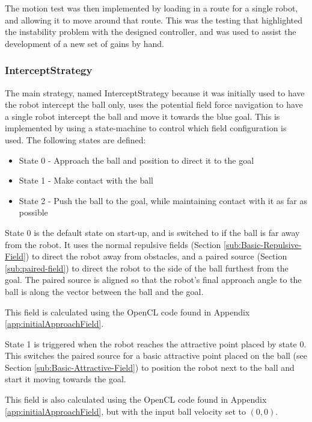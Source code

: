 \documentclass[10pt]{article}
\begin{document}
The motion test was then implemented by loading in a route for a single robot,
and allowing it to move around that route.  This was the testing that
highlighted the instability problem with the designed controller, and was used
to assist the development of a new set of gains by hand.

\subsubsection{InterceptStrategy}

The main strategy, named InterceptStrategy because it was initially used to have
the robot intercept the ball only, uses the potential field force navigation to
have a single robot intercept the ball and move it towards the blue goal.  This
is implemented by using a state-machine to control which field configuration is
used. The following states are defined:

\begin{itemize}
  \item State 0 - Approach the ball and position to direct it to the goal
  \item State 1 - Make contact with the ball
  \item State 2 - Push the ball to the goal, while maintaining contact with it
  as far as possible
\end{itemize}

State 0 is the default state on start-up, and is switched to if the ball is far
away from the robot.  It uses the normal repulsive fields (Section
\ref{sub:Basic-Repulsive-Field}) to direct the robot away from obstacles, and a
paired source (Section \ref{sub:paired-field}) to direct the robot to the side
of the ball furthest from the goal.  The paired source is aligned so that the
robot's final approach angle to the ball is along the vector between the ball
and the goal.

This field is calculated using the OpenCL code found in Appendix
\ref{app:initialApproachField}.

State 1 is triggered when the robot reaches the attractive point placed by state
0.  This switches the paired source for a basic attractive point placed on the
ball (see Section \ref{sub:Basic-Attractive-Field}) to position the robot next
to the ball and start it moving towards the goal.

This field is also calculated using the OpenCL code found in Appendix
\ref{app:initialApproachField}, but with the input ball velocity set to
$\left(0,0\right)$.
\end{document}
